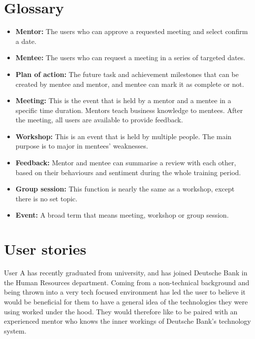 \documentclass[10pt]{article}
\begin{document}
\vspace{-4mm}\section{Glossary}\vspace{-2mm}
\begin{itemize}[leftmargin=1.2cm,noitemsep,align=left]
    \item
        \textbf{Mentor:} The users who can approve a requested meeting and
        select confirm a date.
    \item
        \textbf{Mentee:} The users who can request a meeting in a series of
        targeted dates.
    \item
        \textbf{Plan of action:} The future task and achievement milestones that
        can be created by mentee and mentor, and mentee can mark it as complete
        or not.
    \item
        \textbf{Meeting:} This is the event that is held by a mentor and a mentee
        in a specific time duration. Mentors teach business knowledge to
        mentees. After the meeting, all users are available to provide feedback.
    \item
        \textbf{Workshop:} This is an event that is held by multiple people. The
        main purpose is to major in mentees' weaknesses.
    \item
        \textbf{Feedback:} Mentor and mentee can summarise a review with each
        other, based on their behaviours and sentiment during the whole training
        period.
    \item
        \textbf{Group session:} This function is nearly the same as a workshop,
        except there is no set topic.
    \item
        \textbf{Event:} A broad term that means meeting, workshop or group session.
\end{itemize}

\vspace{-8mm}\section{User stories}\vspace{-2mm}
User A has recently graduated from university, and has joined
Deutsche Bank in the Human Resources department. Coming from a non-technical
background and being thrown into a very tech focused environment has led the
user to believe it would be beneficial for them to have a general idea of the
technologies they were using worked under the hood. They would therefore like to
be paired with an experienced mentor who knows the inner workings of Deutsche
Bank's technology system.
\end{document}
